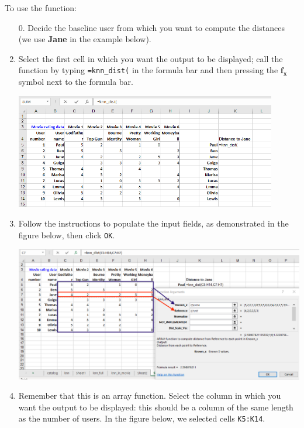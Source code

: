 \documentclass[12pt]{article}
\begin{document}
To use the function:
\begin{enumerate}
\item[0.] Decide the baseline user from which you want to compute the distances (we use \textbf{Jane} in the example below).
\item Select the first cell in which you want the output to be displayed; call the function by typing \texttt{=knn\_dist(} in the formula bar and then pressing the $\boldsymbol{f_x}$ symbol next to the formula bar.

\medskip

\centerline{\includegraphics[width=4.5in]{figures/knndist1}}

\medskip

\item Follow the instructions to populate the input fields, as demonstrated in the figure below, then click \texttt{OK}.

\medskip

\centerline{\includegraphics[width=5.5in]{figures/knndist2}}

\medskip

\item Remember that this is an array function. Select the column in which you want the output to be displayed: this should be a column of the same length as the number of users. In the figure below, we selected cells \texttt{K5:K14}.

\medskip


\end{enumerate}
\end{document}
